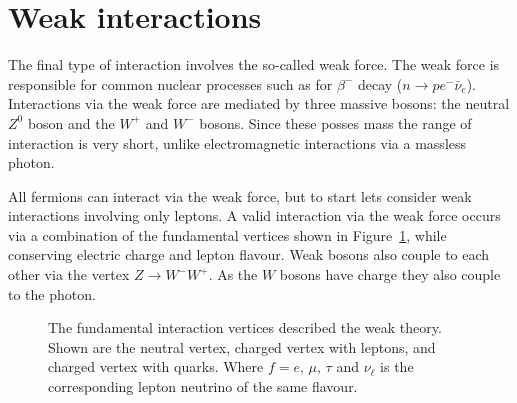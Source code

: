 \section{Weak interactions}\label{sec:TheoryWeakInteractions}

The final type of interaction involves the so-called weak force. The weak force is responsible for common nuclear processes such as for $\beta^{-}$ decay ($n\rightarrow pe^{-}\bar{\nu}_{e}$). Interactions via the weak force are mediated by three massive bosons: the neutral $Z^{0}$ boson and the $W^{+}$ and $W^{-}$ bosons. Since these posses mass the range of interaction is very short, unlike electromagnetic interactions via a massless photon.

All fermions can interact via the weak force, but to start lets consider weak interactions involving only leptons. A valid interaction via the weak force occurs via a combination of the fundamental vertices shown in Figure~\ref{fig:TheoryWeakVertexes}, while conserving electric charge and lepton flavour. Weak bosons also couple to each other via the vertex $Z\rightarrow W^{-}W^{+}$. As the $W$ bosons have charge they also couple to the photon.

\begin{figure}[htbp]
  \centering
    \begin{minipage}[][][t]{.32\textwidth}
      \centering
        
        \label{fig:TheoryWeakNeutralFermions}
    \end{minipage}
    \begin{minipage}[][][t]{.32\textwidth}
      \centering
        
        \label{fig:TheoryWeakChargedLeptons}
    \end{minipage}
    \begin{minipage}[][][t]{.32\textwidth}
      \centering
        
        \label{fig:TheoryWeakChargedQuarks}
    \end{minipage}
    \caption[The fundamental interaction vertices described by the weak theory.]{The fundamental interaction vertices described the weak theory. Shown are the  neutral vertex,  charged vertex with leptons, and  charged vertex with quarks. Where $f=e\textrm{, }\mu\textrm{, }\tau$ and $\nu_{\ell}$ is the corresponding lepton neutrino of the same flavour.}\label{fig:TheoryWeakVertexes}
\end{figure}

